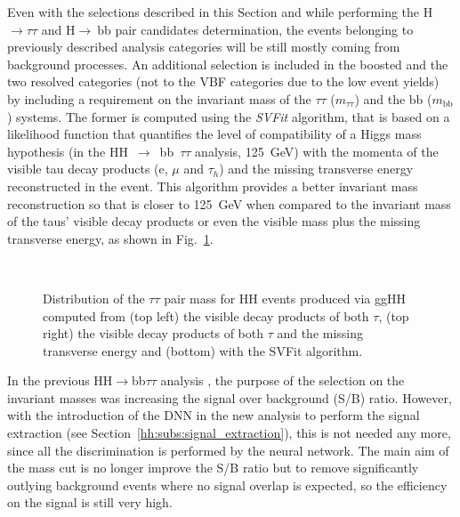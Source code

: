 \documentclass[../main.tex]{subfiles}
\begin{document}
Even with the selections described in this Section and while performing the H$\to\tau\tau$ and H$\to~$bb pair candidates determination, the events belonging to previously described analysis categories will be still mostly coming from background processes. An additional selection is included in the boosted and the two resolved categories (not to the VBF categories due to the low event yields) by including a requirement on the invariant mass of the $\tau\tau$ ($m_{\tau\tau}$) and the bb ($m_{\text{bb}}$) systems. The former is computed using the \textit{SVFit} \cite{hh:analysis:svfit} algorithm, that is based on a likelihood function that quantifies the level of compatibility of a Higgs mass hypothesis (in the HH~$\to$~bb~$\tau\tau$ analysis, 125~GeV) with the momenta of the visible tau decay products (e, $\mu$ and $\tau_h$) and the missing transverse energy reconstructed in the event. This algorithm provides a better invariant mass reconstruction so that is closer to 125~GeV when compared to the invariant mass of the taus' visible decay products or even the visible mass plus the missing transverse energy, as shown in Fig.~\ref{hh:fig:htt_masses}.


\begin{figure}[h!]
\begin{center}
 \\
\end{center}
\caption{Distribution of the $\tau\tau$ pair mass for HH events produced via ggHH computed from (top left) the visible decay products of both $\tau$, (top right) the visible decay products of both $\tau$ and the missing transverse energy and (bottom) with the SVFit algorithm.}
\label{hh:fig:htt_masses}
\end{figure}

In the previous HH$\to$bb$\tau\tau$ analysis \cite{hh:analysis:2016}, the purpose of the selection on the invariant masses was increasing the signal over background (S/B) ratio. However, with the introduction of the DNN in the new analysis to perform the signal extraction (see Section~\ref{hh:subs:signal_extraction}), this is not needed any more, since all the discrimination is performed by the neural network. The main aim of the mass cut is no longer improve the S/B ratio but to remove significantly outlying background events where no signal overlap is expected, so the efficiency on the signal is still very high.
\end{document}
